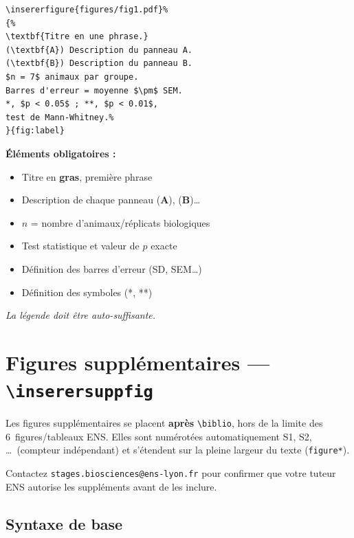 \documentclass[12pt, a4paper]{article}
\begin{document}
\begin{demo}
\begin{lstlisting}[style=latexcode]
\insererfigure{figures/fig1.pdf}%
{%
\textbf{Titre en une phrase.}
(\textbf{A}) Description du panneau A.
(\textbf{B}) Description du panneau B.
$n = 7$ animaux par groupe.
Barres d'erreur = moyenne $\pm$ SEM.
*, $p < 0.05$ ; **, $p < 0.01$,
test de Mann-Whitney.%
}{fig:label}
\end{lstlisting}
\tcblower
\footnotesize\textbf{Éléments obligatoires :}
\begin{itemize}[noitemsep, topsep=2pt]
  \item Titre en \textbf{gras}, première phrase
  \item Description de chaque panneau (\textbf{A}), (\textbf{B})\ldots
  \item $n$ = nombre d'animaux/réplicats biologiques
  \item Test statistique et valeur de $p$ exacte
  \item Définition des barres d'erreur (SD, SEM\ldots)
  \item Définition des symboles (*, **)
\end{itemize}
\medskip
\itshape La légende doit être auto-suffisante.
\end{demo}

\section{Figures supplémentaires — \texttt{\textbackslash inserersuppfig}}

Les figures supplémentaires se placent \textbf{après} \verb|\biblio|, hors de la limite des 6~figures/tableaux ENS. Elles sont numérotées automatiquement S1, S2, \ldots\ (compteur indépendant) et s'étendent sur la pleine largeur du texte (\texttt{figure*}).

\medskip
\begin{astuce}
  Contactez \texttt{stages.biosciences@ens-lyon.fr} pour confirmer que votre tuteur ENS autorise les suppléments avant de les inclure.
\end{astuce}

\newpage

\subsection{Syntaxe de base}
\end{document}
